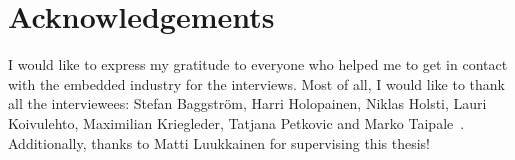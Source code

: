 \documentclass[english]{tktltiki2}
\begin{document}

\section{Acknowledgements}

I would like to express my gratitude to everyone who helped me to get in contact with the embedded industry for the interviews. Most of all, I would like to thank all the interviewees: Stefan Baggström, Harri Holopainen, Niklas Holsti, Lauri Koivulehto, Maximilian Kriegleder, Tatjana Petkovic and Marko Taipale~\cite{BT15, Hol15a, Hol15b, Koi15, Kri15, Pet15}. Additionally, thanks to Matti Luukkainen for supervising this thesis!




\end{document}
